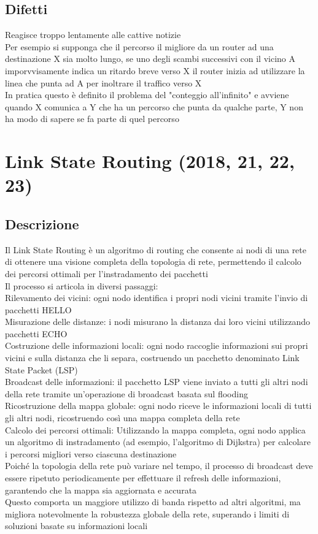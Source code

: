 \documentclass[10pt,oneside,a4paper]{article}
\begin{document}
\subsection{Difetti}
Reagisce troppo lentamente alle cattive notizie\\
Per esempio si supponga che il percorso il migliore da un router ad una destinazione X sia molto lungo, se uno degli scambi successivi con il vicino A imporvvisamente indica un ritardo breve verso X il router inizia ad utilizzare la linea che punta ad A per inoltrare il traffico verso X\\
In pratica questo è definito il problema del "conteggio all'infinito" e avviene quando X comunica a Y che ha un percorso che punta da qualche parte, Y non ha modo di sapere se fa parte di quel percorso
\section{Link State Routing (2018, 21, 22, 23)}
\subsection{Descrizione}
Il Link State Routing è un algoritmo di routing che consente ai nodi di una rete di ottenere una visione completa della topologia di rete, permettendo il calcolo dei percorsi ottimali per l'instradamento dei pacchetti\\
Il processo si articola in diversi passaggi:\\
Rilevamento dei vicini: ogni nodo identifica i propri nodi vicini tramite l’invio di pacchetti HELLO\\
Misurazione delle distanze: i nodi misurano la distanza dai loro vicini utilizzando pacchetti ECHO\\
Costruzione delle informazioni locali: ogni nodo raccoglie informazioni sui propri vicini e sulla distanza che li separa, costruendo un pacchetto denominato Link State Packet (LSP)\\
Broadcast delle informazioni: il pacchetto LSP viene inviato a tutti gli altri nodi della rete tramite un’operazione di broadcast basata sul flooding\\
Ricostruzione della mappa globale: ogni nodo riceve le informazioni locali di tutti gli altri nodi, ricostruendo così una mappa completa della rete\\
Calcolo dei percorsi ottimali: Utilizzando la mappa completa, ogni nodo applica un algoritmo di instradamento (ad esempio, l’algoritmo di Dijkstra) per calcolare i percorsi migliori verso ciascuna destinazione\\
Poiché la topologia della rete può variare nel tempo, il processo di broadcast deve essere ripetuto periodicamente per effettuare il refresh delle informazioni, garantendo che la mappa sia aggiornata e accurata\\
Questo comporta un maggiore utilizzo di banda rispetto ad altri algoritmi, ma migliora notevolmente la robustezza globale della rete, superando i limiti di soluzioni basate su informazioni locali
\end{document}
